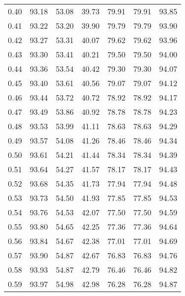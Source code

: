 \begin{tabular}{|c|c|c|c|c|c|c|}
      0.40 &     93.18 &     53.08 &      39.73 &   79.91 &      79.91 &         93.85 \\
      0.41 &     93.22 &     53.20 &      39.90 &   79.79 &      79.79 &         93.90 \\
      0.42 &     93.27 &     53.31 &      40.07 &   79.62 &      79.62 &         93.96 \\
      0.43 &     93.30 &     53.41 &      40.21 &   79.50 &      79.50 &         94.00 \\
      0.44 &     93.36 &     53.54 &      40.42 &   79.30 &      79.30 &         94.07 \\
      0.45 &     93.40 &     53.61 &      40.56 &   79.07 &      79.07 &         94.12 \\
      0.46 &     93.44 &     53.72 &      40.72 &   78.92 &      78.92 &         94.17 \\
      0.47 &     93.49 &     53.86 &      40.92 &   78.78 &      78.78 &         94.23 \\
      0.48 &     93.53 &     53.99 &      41.11 &   78.63 &      78.63 &         94.29 \\
      0.49 &     93.57 &     54.08 &      41.26 &   78.46 &      78.46 &         94.34 \\
      0.50 &     93.61 &     54.21 &      41.44 &   78.34 &      78.34 &         94.39 \\
      0.51 &     93.64 &     54.27 &      41.57 &   78.17 &      78.17 &         94.43 \\
      0.52 &     93.68 &     54.35 &      41.73 &   77.94 &      77.94 &         94.48 \\
      0.53 &     93.73 &     54.50 &      41.93 &   77.85 &      77.85 &         94.53 \\
      0.54 &     93.76 &     54.53 &      42.07 &   77.50 &      77.50 &         94.59 \\
      0.55 &     93.80 &     54.65 &      42.25 &   77.36 &      77.36 &         94.64 \\
      0.56 &     93.84 &     54.67 &      42.38 &   77.01 &      77.01 &         94.69 \\
      0.57 &     93.90 &     54.87 &      42.67 &   76.83 &      76.83 &         94.76 \\
      0.58 &     93.93 &     54.87 &      42.79 &   76.46 &      76.46 &         94.82 \\
      0.59 &     93.97 &     54.98 &      42.98 &   76.28 &      76.28 &         94.87 \\

\end{tabular}
